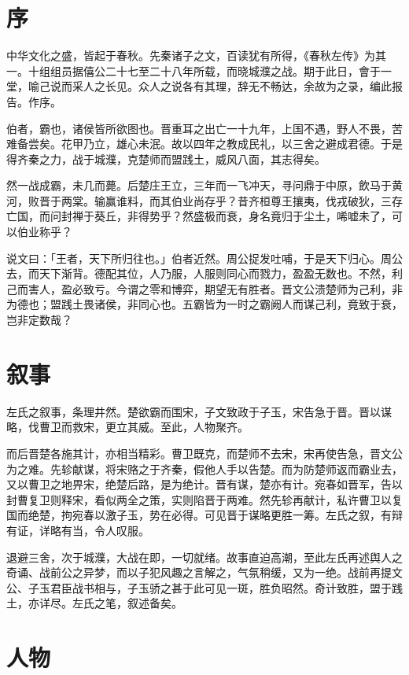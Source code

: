 \documentclass{article}
\date{}
\begin{document}
\makecover
\tableofcontents

\section{序}

中华文化之盛，皆起于春秋。先秦诸子之文，百读犹有所得，《春秋左传》为其一。十组组员据僖公二十七至二十八年所载，而晓城濮之战。期于此日，會于一堂，喻己说而采人之长见。众人之说各有其理，辞无不畅达，余故为之录，编此报告。作序。

伯者，霸也，诸侯皆所欲图也。晋重耳之出亡一十九年，上国不遇，野人不畏，苦难备尝矣。花甲乃立，雄心未泯。故以四年之教成民礼，以三舍之避成君德。于是得齐秦之力，战于城濮，克楚师而盟践土，威风八面，其志得矣。

然一战成霸，未几而薨。后楚庄王立，三年而一飞冲天，寻问鼎于中原，飲马于黄河，败晋于两棠。输赢谁料，而其伯业尚存乎？昔齐桓尊王攘夷，伐戎破狄，三存亡国，而问封禅于葵丘，非得势乎？然盛极而衰，身名竟归于尘土，唏嘘未了，可以伯业称乎？

说文曰：「王者，天下所归往也。」伯者近然。周公捉发吐哺，于是天下归心。周公去，而天下渐背。德配其位，人乃服，人服则同心而戮力，盈盈无数也。不然，利己而害人，盈必致亏。今谓之零和博弈，期望无有胜者。晋文公溃楚师为己利，非为德也；盟践土畏诸侯，非同心也。五霸皆为一时之霸阙人而谋己利，竟致于衰，岂非定数哉？

\section{叙事}

左氏之叙事，条理井然。楚欲霸而围宋，子文致政于子玉，宋告急于晋。晋以谋略，伐曹卫而救宋，更立其威。至此，人物聚齐。

而后晋楚各施其计，亦相当精彩。曹卫既克，而楚师不去宋，宋再使告急，晋文公为之难。先轸献谋，将宋赂之于齐秦，假他人手以告楚。而为防楚师返而霸业去，又以曹卫之地畀宋，绝楚后路，是为绝计。晋有谋，楚亦有计。宛春如晋军，告以封曹复卫则释宋，看似两全之策，实则陷晋于两难。然先轸再献计，私许曹卫以复国而绝楚，拘宛春以激子玉，势在必得。可见晋于谋略更胜一筹。左氏之叙，有辩有证，详略有当，令人叹服。

退避三舍，次于城濮，大战在即，一切就绪。故事直迫高潮，至此左氏再述舆人之奇诵、战前公之异梦，而以子犯风趣之言解之，气氛稍缓，又为一绝。战前再提文公、子玉君臣战书相与，子玉骄之甚于此可见一斑，胜负昭然。奇计致胜，盟于践土，亦详尽。左氏之笔，叙述备矣。

\section{人物}
\end{document}
